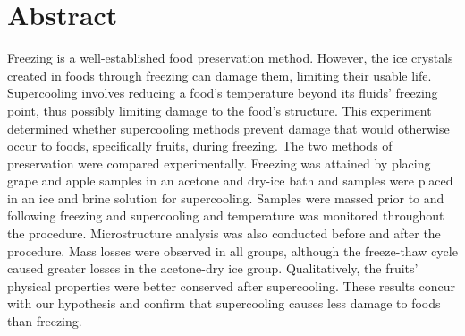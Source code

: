 \section*{Abstract}


Freezing is a well-established food preservation method. However, 
the ice crystals created in foods through freezing can damage them, 
limiting their usable life. Supercooling involves reducing a food’s 
temperature beyond its fluids’ freezing point, thus possibly limiting 
damage to the food’s structure. This experiment determined whether 
supercooling methods prevent damage that would otherwise occur to foods, 
specifically fruits, during freezing. The two methods of preservation 
were compared experimentally. Freezing was attained by placing grape 
and apple samples in an acetone and dry-ice bath and samples were placed 
in an ice and brine solution for supercooling. Samples were massed prior 
to and following freezing and supercooling and temperature was monitored 
throughout the procedure. Microstructure analysis was also conducted 
before and after the procedure. Mass losses were observed in all groups, 
although the freeze-thaw cycle caused greater losses in the acetone-dry 
ice group. Qualitatively, the fruits’ physical properties were better 
conserved after supercooling. These results concur with our hypothesis 
and confirm that supercooling causes less damage to foods than freezing.

